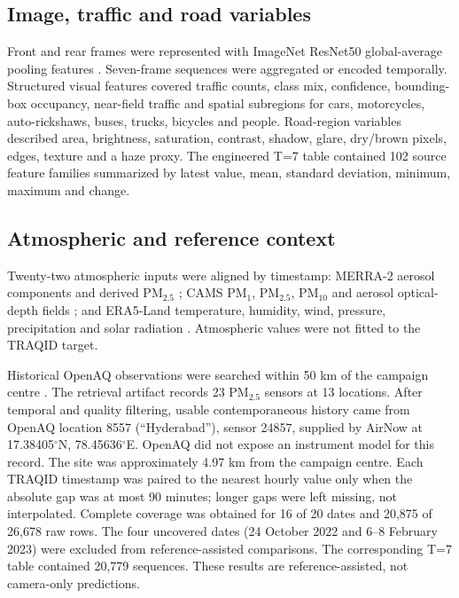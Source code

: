 \documentclass[review,12pt,authoryear]{elsarticle}
\newcommand{\PM}[1]{\ensuremath{\mathrm{PM}_{#1}}}
\newcommand{\pmfine}{\PM{2.5}}
\begin{document}
\subsection{Image, traffic and road variables}

Front and rear frames were represented with ImageNet ResNet50 global-average
pooling features \citep{he2016resnet}. Seven-frame sequences were aggregated or
encoded temporally. Structured visual features covered traffic counts, class
mix, confidence, bounding-box occupancy, near-field traffic and spatial
subregions for cars, motorcycles, auto-rickshaws, buses, trucks, bicycles and
people. Road-region variables described area, brightness, saturation,
contrast, shadow, glare, dry/brown pixels, edges, texture and a haze proxy.
The engineered T=7 table contained 102 source feature families summarized by
latest value, mean, standard deviation, minimum, maximum and change.

\subsection{Atmospheric and reference context}

Twenty-two atmospheric inputs were aligned by timestamp: MERRA-2 aerosol
components and derived \pmfine{} \citep{gelaro2017merra2,geeMerraAer}; CAMS
\PM{1}, \PM{2.5}, \PM{10} and aerosol optical-depth fields
\citep{inness2019cams,geeCamsNrt}; and ERA5-Land temperature, humidity, wind,
pressure, precipitation and solar radiation \citep{geeEra5Land}. Atmospheric
values were not fitted to the TRAQID target.

Historical OpenAQ observations were searched within 50 km of the campaign
centre \citep{openaq2026}. The retrieval artifact records 23 PM$_{2.5}$ sensors
at 13 locations. After temporal and quality filtering, usable contemporaneous
history came from OpenAQ location 8557 (``Hyderabad''), sensor 24857, supplied
by AirNow at 17.38405$^{\circ}$N, 78.45636$^{\circ}$E. OpenAQ did not expose an
instrument model for this record. The site was approximately 4.97 km from the
campaign centre. Each TRAQID timestamp was paired to the nearest hourly value
only when the absolute gap was at most 90 minutes; longer gaps were left
missing, not interpolated. Complete coverage was obtained for 16 of 20 dates
and 20,875 of 26,678 raw rows. The four uncovered dates (24 October 2022 and
6--8 February 2023) were excluded from reference-assisted comparisons. The
corresponding T=7 table contained 20,779 sequences. These results are
reference-assisted, not camera-only predictions.
\end{document}
